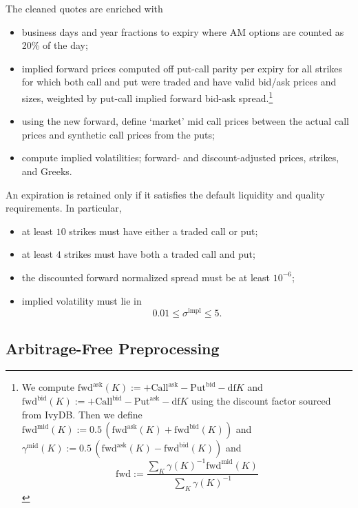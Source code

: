 \documentclass[11pt,a4paper]{article}
\begin{document}
The cleaned quotes are enriched with
%
\begin{itemize}
    \item business days and year fractions to expiry where AM options are counted as 20\% of
    the day;
    \item implied forward prices computed off put-call parity per expiry for all strikes
          for which both call and put were traded and have valid bid/ask prices and sizes, weighted by put-call implied forward bid-ask spread.\footnote{
            We compute
            $\mathrm{fwd}^\mathrm{ask}(K):=+\mathrm{Call}^\mathrm{ask}-\mathrm{Put}^\mathrm{bid}-\mathrm{df} K$ and
            $\mathrm{fwd}^\mathrm{bid}(K):=+\mathrm{Call}^\mathrm{bid}-\mathrm{Put}^\mathrm{ask}-\mathrm{df} K$ using the discount factor sourced from IvyDB.
            Then we
            define $\mathrm{fwd}^\mathrm{mid}(K) := 0.5\,(\mathrm{fwd}^\mathrm{ask}(K) + \mathrm{fwd}^\mathrm{bid}(K))$ and $\gamma^\mathrm{mid}(K) := 0.5\,(\mathrm{fwd}^\mathrm{ask}(K) - \mathrm{fwd}^\mathrm{bid}(K))$ and
            $$
                \mathrm{fwd} :=\frac{ \sum_K \gamma(K)^{-1} \mathrm{fwd}^\mathrm{mid}(K) }
                 { \sum_K \gamma(K)^{-1} }
            $$
          }
    \item using the new forward, define `market' mid call prices between the actual call
    prices and synthetic call prices from the puts;
    \item compute implied volatilities; forward- and discount-adjusted prices, strikes, and Greeks.
\end{itemize}
An expiration is retained only if it satisfies the default liquidity and quality requirements. In particular,
%
\begin{itemize}
    \item at least \(10\) strikes must have either a traded call or put;
    \item at least \(4\) strikes must have both a traded call and put;
    \item the discounted forward normalized spread must be at least \(10^{-6}\);
    \item implied volatility must lie in
    \[
        0.01 \leq \sigma^{\mathrm{impl}} \leq 5.
    \]
\end{itemize}

\subsection{Arbitrage-Free Preprocessing}
\end{document}
